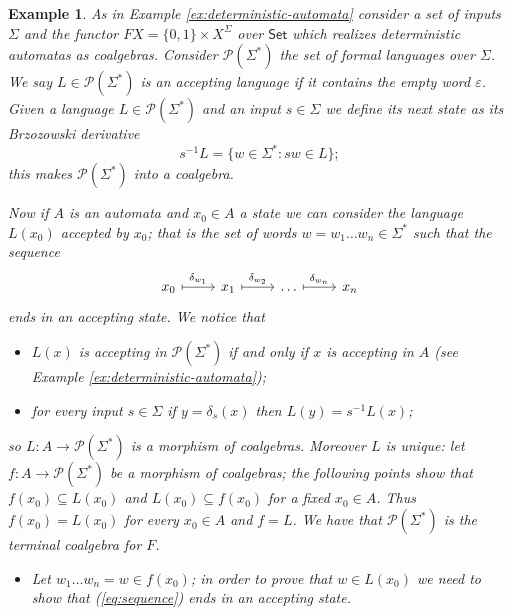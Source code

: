 \documentclass[letterpaper, 11pt, oneside]{memoir}
\theoremstyle{myteo}
\newtheorem{example}[theorem]{Example}
\numberwithin{equation}{section}
\newcommand{\Set}{\textsf{Set}}
\begin{document}
\begin{example}
  As in Example \ref{ex:deterministic-automata} consider a set of inputs \(\Sigma\) and the functor \(FX = \{0, 1\} \times X^\Sigma\) over \(\Set\) which realizes deterministic automatas as coalgebras.
  Consider \(\mathcal{P}(\Sigma^*)\) the set of formal languages over \(\Sigma\).
  We say \(L\in \mathcal{P}(\Sigma^*)\) is an accepting language if it contains the empty word \(\varepsilon\).
  Given a language \(L \in \mathcal{P}(\Sigma^*)\) and an input \(s \in \Sigma\) we define its next state as its Brzozowski derivative
  \begin{equation*}
    s^{-1}L = \{w \in \Sigma^* : sw \in L\};
  \end{equation*}
  this makes \(\mathcal{P}(\Sigma^*)\) into a coalgebra.

  Now if \(A\) is an automata and \(x_0 \in A\) a state we can consider the language \(L(x_0)\) accepted by \(x_0\); that is the set of words \(w = w_1\ldots w_n \in \Sigma^*\) such that the sequence
  \begin{equation}
    \label{eq:sequence}
    \begin{tikzcd}[sep=normal]
      x_0 \ar[r, mapsto, "\delta_{w_1}"] & x_1 \ar[r, mapsto, "\delta_{w_2}"] & \ldots \ar[r, mapsto, "\delta_{w_{n}}"] & x_n
    \end{tikzcd}
  \end{equation}
  ends in an accepting state.
  We notice that
  \begin{itemize}
  \item[1.] \(L(x)\) is accepting in \(\mathcal{P}(\Sigma^*)\) if and only if \(x\) is accepting in \(A\) (see Example \ref{ex:deterministic-automata});
  \item[2.] for every input \(s \in \Sigma\) if \(y = \delta_s(x)\) then \(L(y) = s^{-1}L(x)\);
  \end{itemize}
  so \(L: A \to \mathcal{P}(\Sigma^*)\) is a morphism of coalgebras. Moreover \(L\) is unique: let \(f: A \to \mathcal{P}(\Sigma^*)\) be a morphism of coalgebras; the following points show that \(f(x_0) \subseteq L(x_0)\) and \(L(x_0) \subseteq f(x_0)\) for a fixed \(x_0 \in A\). Thus \(f(x_0) = L(x_0)\) for every \(x_0 \in A\) and \(f = L\).
  We have that \(\mathcal{P}(\Sigma^*)\) is the terminal coalgebra for \(F\).
  \begin{itemize}
  \item[a.] Let \(w_1\ldots w_n = w \in f(x_0)\); in order to prove that \(w \in L(x_0)\) we need to show that (\ref{eq:sequence}) ends in an accepting state.

\end{itemize}
\end{example}
\end{document}
